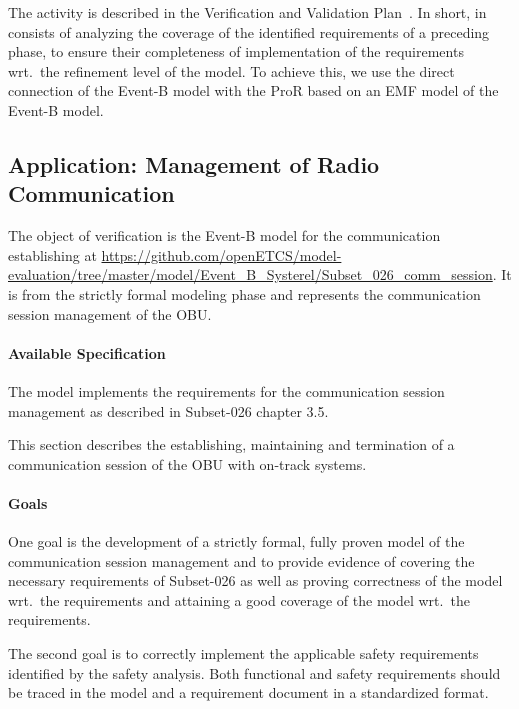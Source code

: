 The activity is described in the Verification and Validation
Plan~\cite{vnvplan}.  In short, in consists of analyzing the coverage of the
identified requirements of a preceding phase, to ensure their completeness of
implementation of the requirements wrt.\ the refinement level of the model. To
achieve this, we use the direct connection of the Event-B model with the ProR
based on an EMF model of the Event-B model.


\subsection{Application: Management of Radio Communication}
\label{sec:object-verification}

The object of verification is the Event-B model for the communication
establishing at {\url{https://github.com/openETCS/model-evaluation/tree/master/model/Event_B_Systerel/Subset_026_comm_session}}. It
is from the strictly formal modeling phase and represents the communication
session management of the OBU\@.

\paragraph{Available Specification}
\label{sec:avail-spec}

The model implements the requirements for the communication session management
as described in Subset-026 chapter 3.5.

This section describes the establishing, maintaining and termination of a
communication session of the OBU with on-track systems.


\paragraph{Goals}

One goal is the development of a strictly formal, fully proven model of the
communication session management and to provide evidence of covering the
necessary requirements of Subset-026 as well as proving correctness of the model
wrt.\ the requirements and attaining a good coverage of the model wrt.\ the
requirements.

The second goal is to correctly implement the applicable safety requirements
identified by the safety analysis. Both functional and safety requirements
should be traced in the model and a requirement document in a standardized
format.


